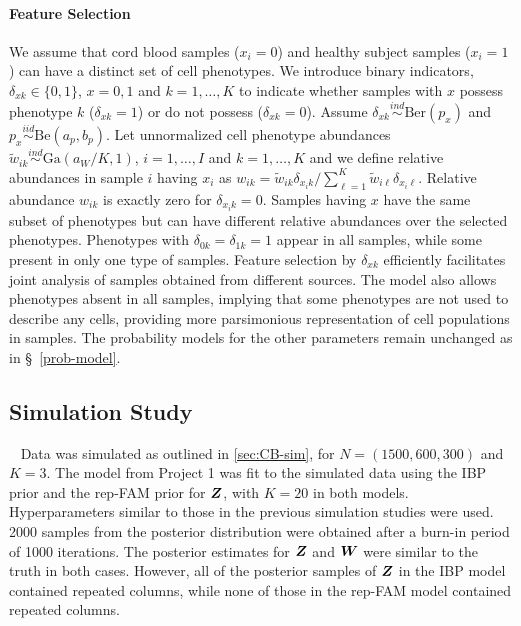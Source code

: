 \documentclass[12pt,]{article}
\newcommand{\iid}{\overset{iid}{\sim}}
\newcommand{\ind}{\overset{ind}{\sim}}
\def\G{\text{Ga}}
\def\Ber{\text{Ber}}
\def\Be{\text{Be}}
\newcommand{\bZ}{\mbox{\boldmath $Z$}}
\newcommand{\bW}{\mbox{\boldmath $W$}}
\begin{document}
\paragraph*{Feature Selection} We assume that cord blood samples ($x_i=0$) and
healthy subject samples ($x_i=1$) can have a distinct set of cell phenotypes.
We introduce binary indicators, $\delta_{xk}\in \{0, 1\}$, $x=0,1$ and
$k=1,\ldots, K$ to indicate whether samples with $x$ possess  phenotype $k$
($\delta_{xk}=1$) or do not possess ($\delta_{xk}=0$). Assume $\delta_{xk} \ind
\Ber(p_{x})$ and $p_x \iid \Be(a_p, b_p)$.  Let unnormalized cell phenotype
abundances $\tilde w_{ik} \ind \G(a_W/K, 1)$, $i=1, \ldots, I$ and $k=1,
\ldots, K$ and we define relative abundances in sample $i$ having $x_i$ as 
$
w_{ik} =\tilde w_{ik} \delta_{x_i k}/\sum_{\ell=1}^K\tilde w_{i\ell} \delta_{x_i \ell}.
$
Relative abundance $w_{ik}$ is exactly zero for $\delta_{x_ik}=0$. Samples
having $x$ have the same subset of phenotypes but can have different relative
abundances over the selected phenotypes. Phenotypes with
$\delta_{0k}=\delta_{1k}=1$ appear in all samples, while some present in only
one type of samples.   Feature selection by $\delta_{xk}$ efficiently
facilitates joint analysis of samples obtained from different sources. The
model also allows phenotypes absent in all samples, implying that some
phenotypes are not used to describe any cells, providing more parsimonious
representation of cell populations in samples. The probability models for the
other parameters remain unchanged as in \S~\ref{prob-model}.  



\subsection{Simulation Study}~\label{sec:rep-sim}
Data was simulated as outlined in \ref{sec:CB-sim}, for $N=(1500, 600, 300)$
and $K=3$. The model from Project 1 was fit to the simulated data using the IBP
prior and the rep-FAM prior for $\bZ$, with $K=20$ in both models.
Hyperparameters similar to those in the previous simulation studies were used.
2000 samples from the posterior distribution were obtained after a burn-in
period of 1000 iterations.  The posterior estimates for $\bZ$ and $\bW$ were
similar to the truth in both cases.  However, all of the posterior samples of
$\bZ$ in the IBP model contained repeated columns, while none of those in the
rep-FAM model contained repeated columns. 
\end{document}
